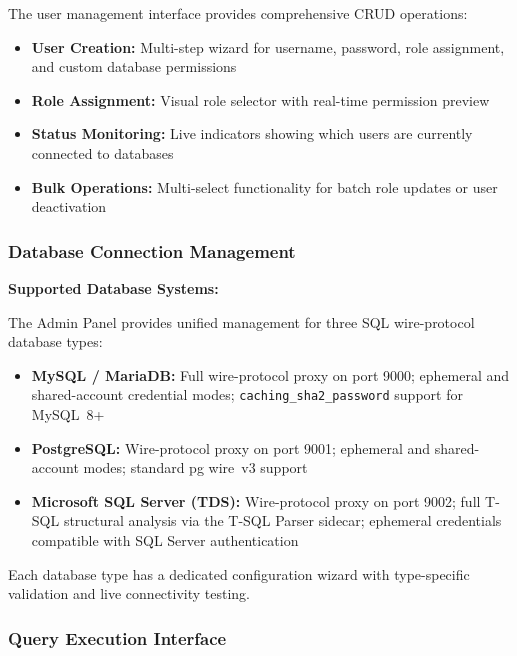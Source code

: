 The user management interface provides comprehensive CRUD operations:

\begin{itemize}
    \item \textbf{User Creation:} Multi-step wizard for username, password, role assignment, and custom database permissions
    \item \textbf{Role Assignment:} Visual role selector with real-time permission preview
    \item \textbf{Status Monitoring:} Live indicators showing which users are currently connected to databases
    \item \textbf{Bulk Operations:} Multi-select functionality for batch role updates or user deactivation
\end{itemize}

\subsubsection{Database Connection Management}

\begin{mdframed}[backgroundcolor=green!5, linecolor=green!40, linewidth=2pt]
\textbf{Supported Database Systems:}

The Admin Panel provides unified management for three SQL wire-protocol database types:

\begin{itemize}
    \item \textbf{MySQL / MariaDB:} Full wire-protocol proxy on port 9000;
          ephemeral and shared-account credential modes;
          \texttt{caching\_sha2\_password} support for MySQL~8+
    \item \textbf{PostgreSQL:} Wire-protocol proxy on port 9001;
          ephemeral and shared-account modes; standard pg wire~v3 support
    \item \textbf{Microsoft SQL Server (TDS):} Wire-protocol proxy on port
          9002; full T-SQL structural analysis via the T-SQL Parser sidecar;
          ephemeral credentials compatible with SQL Server authentication
\end{itemize}

Each database type has a dedicated configuration wizard with type-specific
validation and live connectivity testing.
\end{mdframed}

\subsubsection{Query Execution Interface}

